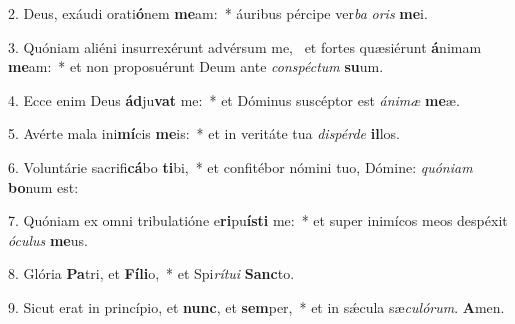 2. Deus, exáudi orati\textbf{ó}nem \textbf{me}am:~*  áuribus pércipe ver\textit{ba} \textit{o}\textit{ris} \textbf{me}i.\

3. Quóniam aliéni insurrexérunt advérsum me, \dag\  et fortes quæsiérunt \textbf{á}nimam \textbf{me}am:~*  et non proposuérunt Deum ante \textit{con}\textit{spéc}\textit{tum} \textbf{su}um.\

4. Ecce enim Deus \textbf{ád}ju\textbf{vat} me:~*  et Dóminus suscéptor est \textit{á}\textit{ni}\textit{mæ} \textbf{me}æ.\

5. Avérte mala ini\textbf{mí}cis \textbf{me}is:~*  et in veritáte tua \textit{dis}\textit{pér}\textit{de} \textbf{il}los.\

6. Voluntárie sacrifi\textbf{cá}bo \textbf{ti}bi,~*  et confitébor nómini tuo, Dómine: \textit{quón}\textit{i}\textit{am} \textbf{bo}num est:\

7. Quóniam ex omni tribulatióne e\textbf{ri}pu\textbf{ís}\textbf{ti} me:~*  et super inimícos meos despéxit \textit{ó}\textit{cu}\textit{lus} \textbf{me}us.\

8. Glória \textbf{Pa}tri, et \textbf{Fí}\textbf{li}o,~*  et Spi\textit{rí}\textit{tu}\textit{i} \textbf{Sanc}to.\

9. Sicut erat in princípio, et \textbf{nunc}, et \textbf{sem}per,~*  et in sǽcula sæ\textit{cu}\textit{ló}\textit{rum}. \textbf{A}men.\

